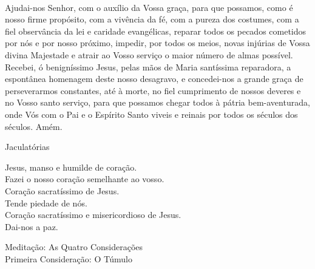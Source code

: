 \begin{flushleft}
    \vspace{.2cm} \\
    Ajudai-nos Senhor, com o auxílio da Vossa graça, para que possamos, como é nosso firme propósito, com a vivência da fé, com a pureza dos costumes, com a fiel observância da lei e caridade evangélicas, reparar todos os pecados cometidos por nós e por nosso próximo, impedir, por todos os meios, novas injúrias de Vossa divina Majestade e atrair ao Vosso serviço o maior número de almas possível.
    \vspace{.2cm} \\
    Recebei, ó benigníssimo Jesus, pelas mãos de Maria santíssima reparadora, a espontânea homenagem deste nosso desagravo, e concedei-nos a grande graça de perseverarmos constantes, até à morte, no fiel cumprimento de nossos deveres e no Vosso santo serviço, para que possamos chegar todos à pátria bem-aventurada, onde Vós com o Pai e o Espírito Santo viveis e reinais por todos os séculos dos séculos. Amém.
\end{flushleft}
\begin{center}
    Jaculatórias
\end{center}
\begin{flushleft}
    \VbarRed{} Jesus, manso e humilde de coração. \\
    \RbarRed{} Fazei o nosso coração semelhante ao vosso. \\
    \VbarRed{} Coração sacratíssimo de Jesus. \\
    \RbarRed{} Tende piedade de nós. \\
    \VbarRed{} Coração sacratíssimo e misericordioso de Jesus. \\
    \RbarRed{} Dai-nos a paz.
\end{flushleft}
\newpage
\begin{center}
    Meditação: As Quatro Considerações \\
    \hfill{} \break{}
    \textcolor{VioletRed2}{Primeira Consideração: O Túmulo}
\end{center}
